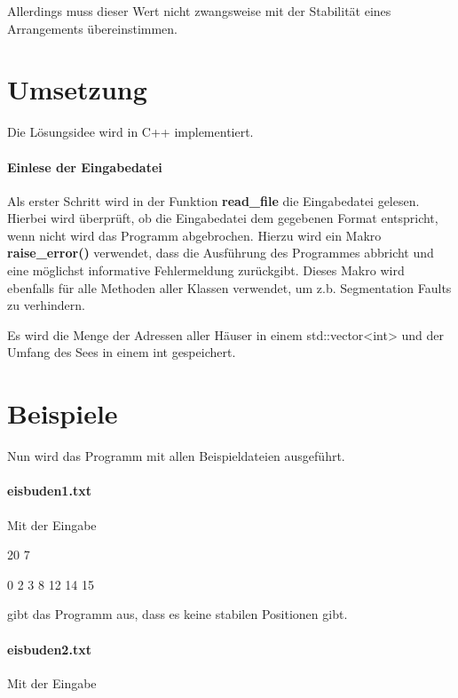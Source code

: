 \documentclass[a4paper,10pt,ngerman]{scrartcl}
\begin{document}
Allerdings muss dieser Wert nicht zwangsweise mit der Stabilität eines Arrangements übereinstimmen.

\section{Umsetzung}
Die Lösungsidee wird in C++ implementiert.

\paragraph{Einlese der Eingabedatei}
Als erster Schritt wird in der Funktion \textbf{read\_file} die Eingabedatei gelesen.
Hierbei wird überprüft, ob die Eingabedatei dem gegebenen Format entspricht, wenn nicht wird das Programm abgebrochen.
Hierzu wird ein Makro \textbf{raise\_error()} verwendet, dass die Ausführung des Programmes abbricht und eine möglichst informative Fehlermeldung zurückgibt.
Dieses Makro wird ebenfalls für alle Methoden aller Klassen verwendet, um z.b. Segmentation Faults zu verhindern.

Es wird die Menge der Adressen aller Häuser in einem std::vector<int> und der Umfang des Sees in einem int gespeichert.


\section{Beispiele}
Nun wird das Programm mit allen Beispieldateien ausgeführt.

\paragraph{eisbuden1.txt}
Mit der Eingabe

20 7

0 2 3 8 12 14 15

gibt das Programm aus, dass es keine stabilen Positionen gibt.

\paragraph{eisbuden2.txt}
Mit der Eingabe
\end{document}
